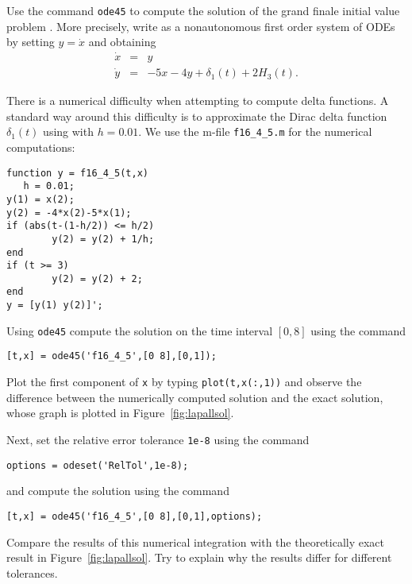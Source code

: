 \documentclass{ximera}
\begin{document}
\begin{exercise} \label{c13.4.5}
Use the \Matlab command {\tt ode45} to compute the solution of the grand 
finale initial value problem .  
More precisely, write  as a nonautonomous first order 
system of ODEs by setting $y=\dot{x}$ and obtaining
\begin{equation*}
\begin{array}{rcl}
\dot{x} & = & y \\
\dot{y} & = & -5x-4y+\delta_1(t)+2H_3(t).
\end{array}
\end{equation*}

There is a numerical difficulty when attempting to compute delta functions. 
A standard way around this difficulty is to approximate the Dirac delta 
function $\delta_1(t)$ using  with $h=0.01$.  We use the 
\Matlab m-file {\tt f16\_4\_5.m} for the numerical computations:
\begin{verbatim}
function y = f16_4_5(t,x)
   h = 0.01;
y(1) = x(2);
y(2) = -4*x(2)-5*x(1);
if (abs(t-(1-h/2)) <= h/2)
        y(2) = y(2) + 1/h;
end
if (t >= 3)
        y(2) = y(2) + 2;
end
y = [y(1) y(2)]';
\end{verbatim}

Using {\tt ode45} compute the solution on the 
time interval $[0,8]$ using the command
\begin{verbatim}
[t,x] = ode45('f16_4_5',[0 8],[0,1]); 
\end{verbatim}
Plot the first component of {\tt x} by typing {\tt plot(t,x(:,1))} and observe 
the difference between the numerically computed solution and the exact 
solution, whose graph is plotted in Figure~\ref{fig:lapallsol}.

Next, set the relative error tolerance {\tt 1e-8} using the command
\begin{verbatim}
options = odeset('RelTol',1e-8);
\end{verbatim}
and compute the solution using the command
\begin{verbatim}
[t,x] = ode45('f16_4_5',[0 8],[0,1],options); 
\end{verbatim}
Compare the results of this numerical integration with the theoretically exact 
result in Figure~\ref{fig:lapallsol}.  Try to explain why the results differ 
for different tolerances.
\end{exercise}
\end{document}

